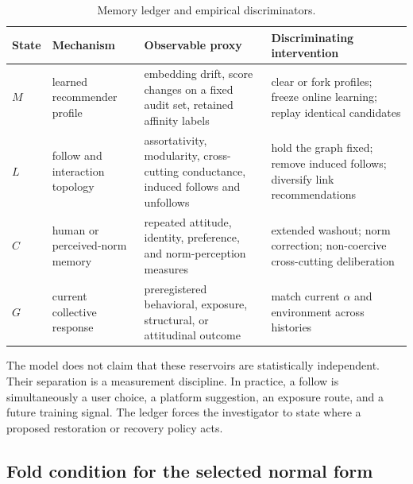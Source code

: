 \documentclass[pdflatex,sn-mathphys-num]{sn-jnl}
\begin{document}
\begin{table}[!htbp]
\centering
\caption{Memory ledger and empirical discriminators.}
\label{tab:ledger}
\small
\begin{tabularx}{\textwidth}{|p{1.0cm}|p{3.0cm}|Y|Y|}
\hline
\textbf{State} & \textbf{Mechanism} & \textbf{Observable proxy} & \textbf{Discriminating intervention}\\
\hline
$M$ & learned recommender profile & embedding drift, score changes on a fixed audit set, retained affinity labels & clear or fork profiles; freeze online learning; replay identical candidates\\
\hline
$L$ & follow and interaction topology & assortativity, modularity, cross-cutting conductance, induced follows and unfollows & hold the graph fixed; remove induced follows; diversify link recommendations\\
\hline
$C$ & human or perceived-norm memory & repeated attitude, identity, preference, and norm-perception measures & extended washout; norm correction; non-coercive cross-cutting deliberation\\
\hline
$G$ & current collective response & preregistered behavioral, exposure, structural, or attitudinal outcome & match current $\alpha$ and environment across histories\\
\hline
\end{tabularx}
\end{table}

The model does not claim that these reservoirs are statistically independent. Their separation is a measurement discipline. In practice, a follow is simultaneously a user choice, a platform suggestion, an exposure route, and a future training signal. The ledger forces the investigator to state where a proposed restoration or recovery policy acts.

\subsection{Fold condition for the selected normal form}
\end{document}
